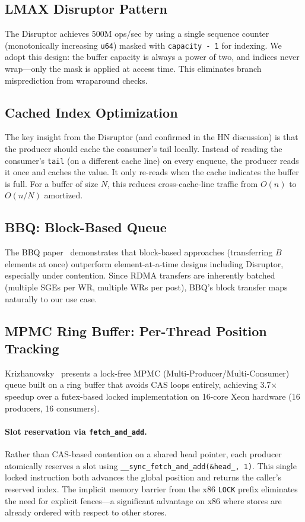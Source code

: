 \documentclass[11pt,letterpaper]{article}
\begin{document}
\subsection{LMAX Disruptor Pattern}

The Disruptor achieves 500M ops/sec by using a single sequence counter (monotonically increasing \texttt{u64}) masked with \texttt{capacity - 1} for indexing. We adopt this design: the buffer capacity is always a power of two, and indices never wrap---only the mask is applied at access time. This eliminates branch misprediction from wraparound checks.

\subsection{Cached Index Optimization}

The key insight from the Disruptor (and confirmed in the HN discussion) is that the producer should cache the consumer's tail locally. Instead of reading the consumer's \texttt{tail} (on a different cache line) on every enqueue, the producer reads it once and caches the value. It only re-reads when the cache indicates the buffer is full. For a buffer of size $N$, this reduces cross-cache-line traffic from $O(n)$ to $O(n/N)$ amortized.

\subsection{BBQ: Block-Based Queue}

The BBQ paper~\cite{bbq-usenix} demonstrates that block-based approaches (transferring $B$ elements at once) outperform element-at-a-time designs including Disruptor, especially under contention. Since RDMA transfers are inherently batched (multiple SGEs per WR, multiple WRs per post), BBQ's block transfer maps naturally to our use case.

\subsection{MPMC Ring Buffer: Per-Thread Position Tracking}

Krizhanovsky~\cite{krizhanovsky-mpmc} presents a lock-free MPMC (Multi-Producer/Multi-Consumer) queue built on a ring buffer that avoids CAS loops entirely, achieving 3.7$\times$ speedup over a futex-based locked implementation on 16-core Xeon hardware (16 producers, 16 consumers).

\paragraph{Slot reservation via \texttt{fetch\_and\_add}.}
Rather than CAS-based contention on a shared head pointer, each producer atomically reserves a slot using \texttt{\_\_sync\_fetch\_and\_add(\&head\_, 1)}. This single locked instruction both advances the global position and returns the caller's reserved index. The implicit memory barrier from the x86 \texttt{LOCK} prefix eliminates the need for explicit fences---a significant advantage on x86 where stores are already ordered with respect to other stores.
\end{document}
